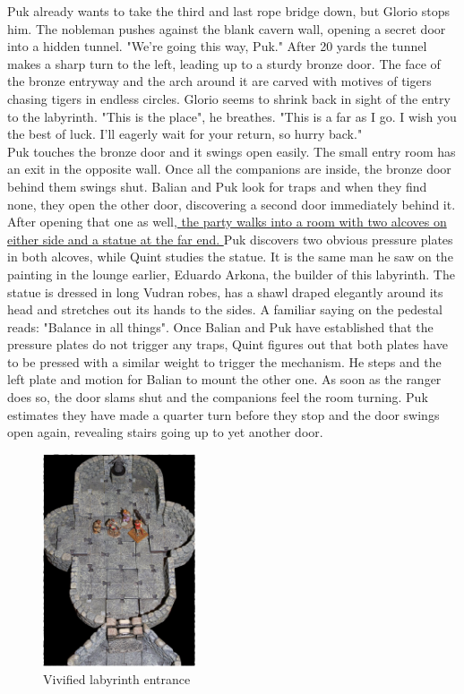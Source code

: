 Puk already wants to take the third and last rope bridge down, but Glorio stops him. The nobleman pushes against the blank cavern wall, opening a secret door into a hidden tunnel. "We're going this way, Puk." After 20 yards the tunnel makes a sharp turn to the left, leading up to a sturdy bronze door. The face of the bronze entryway and the arch around it are carved with motives of tigers chasing tigers in endless circles. Glorio seems to shrink back in sight of the entry to the labyrinth. "This is the place", he breathes. "This is a far as I go. I wish you the best of luck. I'll eagerly wait for your return, so hurry back."\\

Puk touches the bronze door and it swings open easily. The small entry room has an exit in the opposite wall. Once all the companions are inside, the bronze door behind them swings shut. Balian and Puk look for traps and when they find none, they open the other door, discovering a second door immediately behind it. After opening that one as well,\hyperref[fig:Vivified-labyrinth-entrance-563930398]{ the party walks into a room with two alcoves on either side and a statue at the far end. } Puk discovers two obvious pressure plates in both alcoves, while Quint studies the statue. It is the same man he saw on the painting in the lounge earlier, Eduardo Arkona, the builder of this labyrinth. The statue is dressed in long Vudran robes, has a shawl draped elegantly around its head and stretches out its hands to the sides. A familiar saying on the pedestal reads: "Balance in all things". Once Balian and Puk have established that the pressure plates do not trigger any traps, Quint figures out that both plates have to be pressed with a similar weight to trigger the mechanism. He steps and the left plate and motion for Balian to mount the other one. As soon as the ranger does so, the door slams shut and the companions feel the room turning. Puk estimates they have made a quarter turn before they stop and the door swings open again, revealing stairs going up to yet another door. \\

\begin{figure}[h]
	\centering
	\includegraphics[width=0.4\textwidth]{images/Vivified-labyrinth-entrance-563930398_mod.jpg}
	\caption{Vivified labyrinth entrance}
	\label{fig:Vivified-labyrinth-entrance-563930398}
\end{figure}

